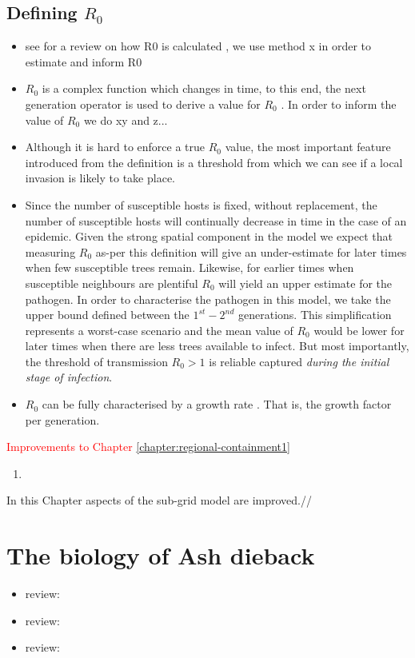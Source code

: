 \blindtext

\subsection{Defining $R_0$}

\begin{itemize}
    \item see for a review on how R0 is calculated \cite{perspectives-on-r0}, we use method x in order to estimate and inform R0
    \item $R_0$ is a complex function which changes in time, to this end, the next generation operator is used to derive a value for $R_0$ \cite{doi:10.1098/rsif.2009.0386}. In order to inform the value of $R_0$ we do xy and z...
    \item Although it is hard to enforce a true $R_0$ value, the most important feature introduced from the definition is a threshold from which we can see if a local invasion is likely to take place.
    \item Since the number of susceptible hosts is fixed, without replacement, the number of susceptible hosts will continually decrease in time in the case of an epidemic. Given the strong spatial component in the model we expect that measuring $R_0$ as-per this definition will give an under-estimate for later times when few susceptible trees remain. Likewise, for earlier times when susceptible neighbours are plentiful $R_0$ will yield an upper estimate for the pathogen. In order to characterise the pathogen in this model, we take the upper bound defined between the $1^{st}-2^{nd}$ generations. This simplification represents a worst-case scenario and the mean value of $R_0$ would be lower for later times when there are less trees available to infect. But most importantly, the threshold of transmission $R_0>1$ is reliable captured \textit{during the initial stage of infection}.
    \item $R_0$ can be fully characterised by a growth rate \cite{R0-construct}. That is, the growth factor per generation.
    
\end{itemize}

\textcolor{red}{Improvements to Chapter \ref{chapter:regional-containment1}}
\begin{enumerate}
    \item
\end{enumerate}

In this Chapter aspects of the sub-grid model are improved.//
\section{The biology of Ash dieback} %
\begin{itemize}
    \item review: \cite{ash-dieback-costs}
    \item review: \cite{doi:10.1111/1365-2745.13383}
    \item review: \cite{ash-tree1}
\end{itemize}

